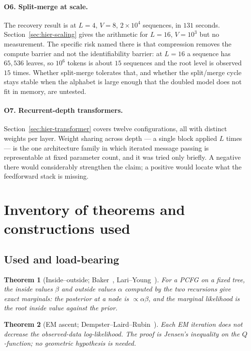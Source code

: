 \documentclass[11pt,a4paper]{article}
\theoremstyle{plain}
\newtheorem{theorem}{Theorem}
\theoremstyle{definition}
\begin{document}
\paragraph{O6. Split-merge at scale.}
The recovery result is at $L=4$, $V=8$, $2\times10^4$ sequences, in $131$
seconds. Section~\ref{sec:hier-scaling} gives the arithmetic for $L=16$,
$V=10^3$ but no measurement. The specific risk named there is that compression
removes the compute barrier and not the identifiability barrier: at $L=16$ a
sequence has $65{,}536$ leaves, so $10^6$ tokens is about $15$ sequences and the
root level is observed $15$ times. Whether split-merge tolerates that, and
whether the split/merge cycle stays stable when the alphabet is large enough
that the doubled model does not fit in memory, are untested.

\paragraph{O7. Recurrent-depth transformers.}
Section~\ref{sec:hier-transformer} covers twelve configurations, all with
distinct weights per layer. Weight sharing across depth --- a single block
applied $L$ times --- is the one architecture family in which iterated message
passing is representable at fixed parameter count, and it was tried only
briefly. A negative there would considerably strengthen the claim; a positive
would locate what the feedforward stack is missing.


\section{Inventory of theorems and constructions used}
\label{sec:hier-inventory}

\subsection*{Used and load-bearing}

\begin{theorem}[Inside--outside; Baker~\cite{baker1979}, Lari--Young~\cite{lari1990}]
\label{thm:inside}
For a PCFG on a fixed tree, the inside values $\beta$ and outside values
$\alpha$ computed by the two recursions give exact marginals: the posterior at
a node is $\propto \alpha\beta$, and the marginal likelihood is the root inside
value against the prior.
\end{theorem}

\begin{theorem}[EM ascent; Dempster--Laird--Rubin~\cite{dlr1977}]
\label{thm:em}
Each EM iteration does not decrease the observed-data log-likelihood. The proof
is Jensen's inequality on the $Q$-function; no geometric hypothesis is needed.
\end{theorem}
\end{document}

